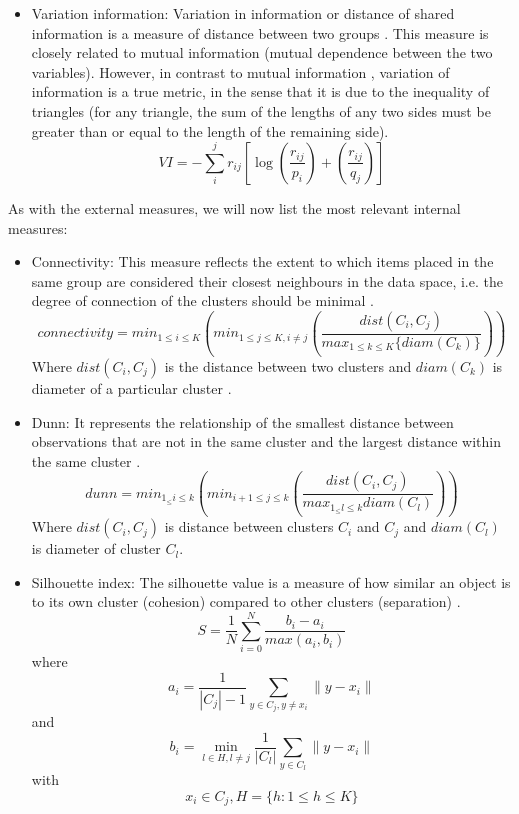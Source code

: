 \begin{itemize}
    \item Variation information: Variation in information or distance of shared information is a measure of distance between two groups \citep{b43}. This measure is closely related to mutual information (mutual dependence between the two variables). However, in contrast to mutual information \citep{b63}, variation of information is a true metric, in the sense that it is due to the inequality of triangles (for any triangle, the sum of the lengths of any two sides must be greater than or equal to the length of the remaining side).
    \begin{equation}
       VI = - \sum_{i}^{j} r_{ij}\left[\log\left(\frac{r_{ij}}{p_{i}}\right) +\left(\frac{r_{ij}}{q_{j}} \right)\right]
    \end{equation}
\end{itemize}

As with the external measures, we will now list the most relevant internal measures:
\begin{itemize}
    \item Connectivity: This measure reflects the extent to which items placed in the same group are considered their closest neighbours in the data space, i.e. the degree of connection of the clusters should be minimal \citep{b39}.
    \begin{equation}
        connectivity = min_{ 1\leq i \leq K} \left( min_{1\leq j \leq K, i\not= j} \left( \frac{dist(C_i,C_j)}{max_{1\leq k \leq K} \lbrace diam(C_k) \rbrace }  \right) \right)
    \end{equation}
    Where $dist(C_i,C_j)$ is the distance between two clusters and $diam(C_k)$ is diameter of a particular cluster \citep{b39}.
    \item Dunn: It represents the relationship of the smallest distance between observations that are not in the same cluster and the largest distance within the same cluster \citep{b44}.
    \begin{equation}
    dunn =  min_{1_\leq i\leq k} \left( min_{i+1\leq j \leq k}  \left( \frac{dist(C_i,C_j)}{max_{1_\leq l \leq k} diam(C_{l})} \right) \right)
    \end{equation}
    Where $dist(C_{i},C_{j})$ is distance between clusters $C_{i}$ and $C_{j}$ and $diam(C_{l})$ is diameter of cluster $C_{l}$.
    \item Silhouette index: The silhouette value is a measure of how similar an object is to its own cluster (cohesion) compared to other clusters (separation) \citep{b45}.
    \begin{equation}
        S = \frac{1}{N}\sum_{i=0}^{N}\frac{b_{i} - a_{i}}{max(a_{i},b_{i})}
    \end{equation}
    where $$a_{i}=\frac{1}{|C_{j}| - 1} \sum_{y\in C_{j},y\neq x_{i}}^{}\|y-x_{i}\|$$ and
    $$ b_{i} = \min\limits_{l \in H, l\neq j}^{} \frac{1}{|C_{l}|} \sum_{y \in C_{l}}^{} \| y - x_{i} \| $$ with
    $$ x_{i} \in C_{j}, H = \{h: 1 \leq h \leq K\}$$
\end{itemize}

